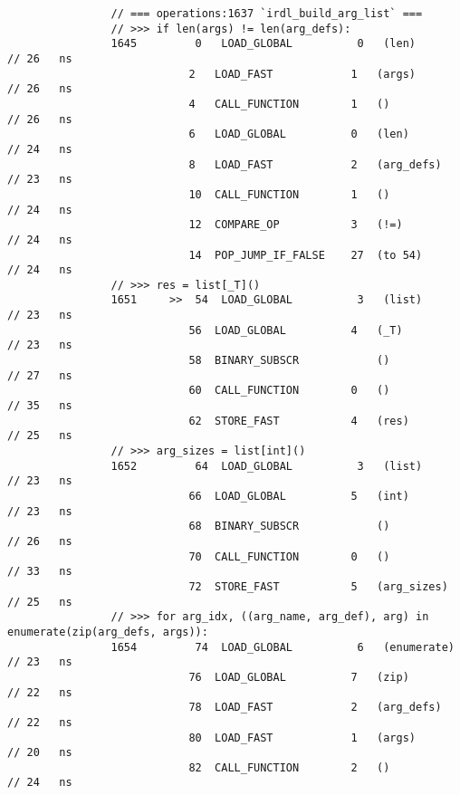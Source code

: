 \begin{code}
\begin{verbatim}
                // === operations:1637 `irdl_build_arg_list` ===
                // >>> if len(args) != len(arg_defs):
                1645         0   LOAD_GLOBAL          0   (len)                             // 26   ns
                            2   LOAD_FAST            1   (args)                             // 26   ns
                            4   CALL_FUNCTION        1   ()                                 // 26   ns
                            6   LOAD_GLOBAL          0   (len)                              // 24   ns
                            8   LOAD_FAST            2   (arg_defs)                         // 23   ns
                            10  CALL_FUNCTION        1   ()                                 // 24   ns
                            12  COMPARE_OP           3   (!=)                               // 24   ns
                            14  POP_JUMP_IF_FALSE    27  (to 54)                            // 24   ns
                // >>> res = list[_T]()
                1651     >>  54  LOAD_GLOBAL          3   (list)                            // 23   ns
                            56  LOAD_GLOBAL          4   (_T)                               // 23   ns
                            58  BINARY_SUBSCR            ()                                 // 27   ns
                            60  CALL_FUNCTION        0   ()                                 // 35   ns
                            62  STORE_FAST           4   (res)                              // 25   ns
                // >>> arg_sizes = list[int]()
                1652         64  LOAD_GLOBAL          3   (list)                            // 23   ns
                            66  LOAD_GLOBAL          5   (int)                              // 23   ns
                            68  BINARY_SUBSCR            ()                                 // 26   ns
                            70  CALL_FUNCTION        0   ()                                 // 33   ns
                            72  STORE_FAST           5   (arg_sizes)                        // 25   ns
                // >>> for arg_idx, ((arg_name, arg_def), arg) in enumerate(zip(arg_defs, args)):
                1654         74  LOAD_GLOBAL          6   (enumerate)                       // 23   ns
                            76  LOAD_GLOBAL          7   (zip)                              // 22   ns
                            78  LOAD_FAST            2   (arg_defs)                         // 22   ns
                            80  LOAD_FAST            1   (args)                             // 20   ns
                            82  CALL_FUNCTION        2   ()                                 // 24   ns

\end{verbatim}
\end{code}
